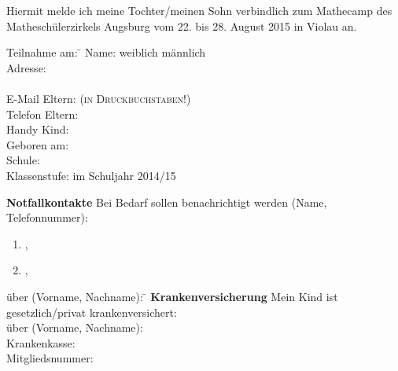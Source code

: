 \documentclass[13pt]{zettel}
\begin{document}
\renewcommand{\betreff}{Anmeldung zum Mathecamp des Matheschülerzirkels Augsburg}


\vspace{-1.0em}

Hiermit melde ich meine Tochter/meinen Sohn verbindlich zum Mathecamp des
Mathe\-schü\-ler\-zir\-kels Augsburg vom 22. bis 28. August 2015 in
Violau an.

\vspace{-1.0em}
\doublespacing
\begin{tabbing}
  Teilnahme am: \= \kill
  Name: \> \freistLang \checkbox weiblich \checkbox männlich \\
  Adresse: \> \freistLang \\
  \> \freistLang \\
  E-Mail Eltern: \> \freistLang{} \textsc{\small (in Druckbuchstaben!)} \\
  Telefon Eltern: \> \freistLang \\
  Handy Kind: \> \freistLang \\
  Geboren am: \> \freistLang \\
  Schule: \> \freistLang \\
  Klassenstufe: \> \freistKurz{} im Schuljahr 2014/15
\end{tabbing}

\vspace{-0.8cm}
\begin{shaded}
\textbf{Notfallkontakte} Bei Bedarf sollen benachrichtigt werden (Name, Telefonnummer):
\begin{enumerate}
\item \freist{7cm},\quad\freist{7cm}
\item \freist{7cm},\quad\freist{7cm}
\end{enumerate}
\end{shaded}

\enlargethispage{2cm}
\vspace{-1.0cm}
\begin{shaded}
\vspace{-2.2em}
\begin{tabbing}
über (Vorname, Nachname): \= \kill
\textbf{Krankenversicherung} Mein Kind ist gesetzlich/privat krankenversichert: \\
über (Vorname, Nachname): \> \freistLang \\
Krankenkasse: \> \freistLang \\
Mitgliedsnummer: \> \freistLang
\end{tabbing}
\vspace{-1.5em}
\end{shaded}
\end{document}
